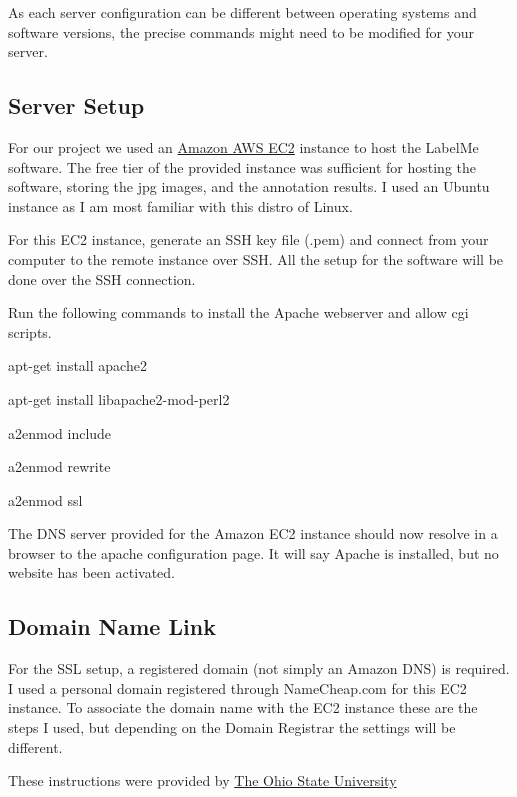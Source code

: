 \documentclass[a4paper]{article}
\begin{document}
As each server configuration can be different between operating systems and software versions, the precise commands might need to be modified for your server. 

\subsection{Server Setup}
For our project we used an \href{https://aws.amazon.com/ec2/}{Amazon AWS EC2} instance to host the LabelMe software. The free tier of the provided instance was sufficient for hosting the software, storing the jpg images, and the annotation results. I used an Ubuntu instance as I am most familiar with this distro of Linux.

For this EC2 instance, generate an SSH key file (.pem) and connect from your computer to the remote instance over SSH. All the setup for the software will be done over the SSH connection. 

Run the following commands to install the Apache webserver and allow cgi scripts.

\bigskip

		apt-get install apache2
	
		apt-get install libapache2-mod-perl2
	
		a2enmod include
	
		a2enmod rewrite
		
		a2enmod ssl

\bigskip

The DNS server provided for the Amazon EC2 instance should now resolve in a browser to the apache configuration page. It will say Apache is installed, but no website has been activated. 

\subsection{Domain Name Link}

For the SSL setup, a registered domain (not simply an Amazon DNS) is required. I used a personal domain registered through NameCheap.com for this EC2 instance. To associate the domain name with the EC2 instance these are the steps I used, but depending on the Domain Registrar the settings will be different. 

These instructions were provided by \href{https://u.osu.edu/walujo.1/2016/07/07/associate-namecheap-domain-to-amazon-ec2-instance/}{The Ohio State University}
\end{document}

